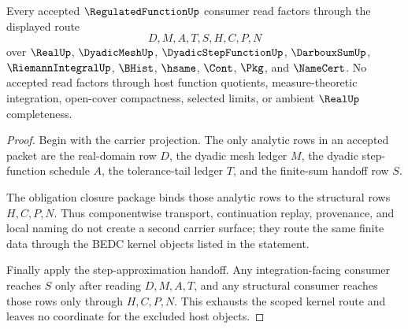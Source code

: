 \begin{theorem}
\label{thm:regulated-function-scoped-kernel-route}
Every accepted $\RegulatedFunctionUp$ consumer read factors through the displayed route
$$
D,M,A,T,S,H,C,P,N
$$
over $\RealUp$, $\DyadicMeshUp$, $\DyadicStepFunctionUp$, $\DarbouxSumUp$, $\RiemannIntegralUp$, $\BHist$, $\hsame$, $\Cont$, $\Pkg$, and $\NameCert$. No accepted read factors through host function quotients, measure-theoretic integration, open-cover compactness, selected limits, or ambient $\RealUp$ completeness.
\end{theorem}
\begin{proof}
Begin with the carrier projection. The only analytic rows in an accepted packet are the real-domain row $D$, the dyadic mesh ledger $M$, the dyadic step-function schedule $A$, the tolerance-tail ledger $T$, and the finite-sum handoff row $S$.

The obligation closure package binds those analytic rows to the structural rows $H,C,P,N$. Thus componentwise transport, continuation replay, provenance, and local naming do not create a second carrier surface; they route the same finite data through the BEDC kernel objects listed in the statement.

Finally apply the step-approximation handoff. Any integration-facing consumer reaches $S$ only after reading $D,M,A,T$, and any structural consumer reaches those rows only through $H,C,P,N$. This exhausts the scoped kernel route and leaves no coordinate for the excluded host objects.
\end{proof}

